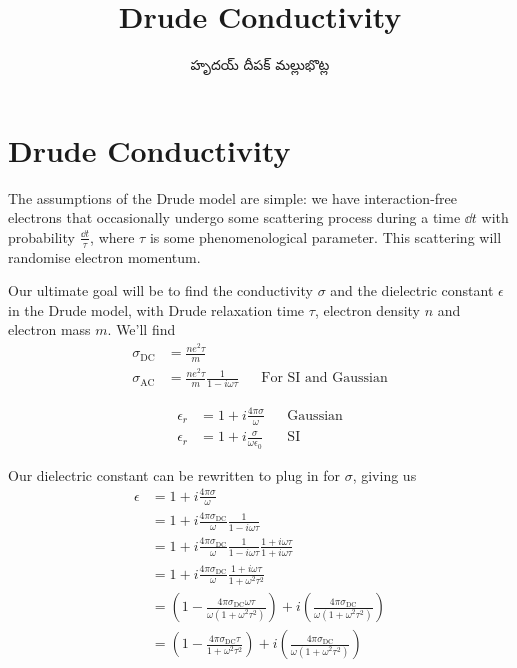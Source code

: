\documentclass[../main.tex]{subfiles}
\title{Drude Conductivity}
\author{\begin{telugu}హృదయ్ దీపక్ మల్లుభొట్ల\end{telugu}}
\date{}
\newcommand{\sigmaDC}{\sigma_{\textrm{DC}}}
\newcommand{\sigmaAC}{\sigma_{\textrm{AC}}}
\begin{document}
	\onlyinsubfile{\maketitle}
	\section{Drude Conductivity} \label{sec:DrudeConductivity}

	The assumptions of the Drude model are simple: we have interaction-free electrons that occasionally undergo some scattering process during a time $\dd{t}$ with probability $\frac{\dd{t}}{\tau}$, where $\tau$ is some phenomenological parameter.
	This scattering will randomise electron momentum.

	Our ultimate goal will be to find the conductivity $\sigma$ and the dielectric constant $\epsilon$ in the Drude model, with Drude relaxation time $\tau$, electron density $n$ and electron mass $m$.
	We'll find
	\begin{align}
		\sigmaDC &= \frac{n e^2 \tau}{m} \\
		\sigmaAC &= \frac{n e^2 \tau}{m} \frac{1}{1 - i \omega \tau} && \text{For SI and Gaussian} \label{eq:DrudeTheory:SigmaAC}
	\end{align}

	\begin{subequations}
		\begin{align}
			\epsilon_r &= 1 + i \frac{4 \pi \sigma}{\omega} && \text{Gaussian} \\
			\epsilon_r &= 1 + i \frac{\sigma}{\omega \epsilon_0} && \text{SI}
		\end{align}
	\end{subequations}

	Our dielectric constant can be rewritten to plug in for $\sigma$, giving us
	\begin{align}
		\epsilon &= 1 + i \frac{4 \pi \sigma}{\omega} \\
		&= 1 + i \frac{4 \pi \sigmaDC}{\omega} \frac{1}{1 - i \omega \tau} \\
		&= 1 + i \frac{4 \pi \sigmaDC}{\omega} \frac{1}{1 - i \omega \tau} \frac{1 + i \omega\tau}{1 + i \omega \tau} \\
		&= 1 + i \frac{4 \pi \sigmaDC}{\omega} \frac{1 + i \omega \tau}{1 + \omega^2 \tau^2} \\
		&= \left(1 - \frac{4 \pi \sigmaDC \omega \tau}{\omega\left(1 + \omega^2 \tau^2 \right)} \right) + i \left( \frac{4 \pi \sigmaDC}{\omega \left( 1 + \omega^2 \tau^2 \right)} \right) \\
		&= \left(1 - \frac{4 \pi \sigmaDC  \tau}{1 + \omega^2 \tau^2 } \right) + i \left( \frac{4 \pi \sigmaDC}{\omega \left( 1 + \omega^2 \tau^2 \right)} \right)
	\end{align}
\end{document}
